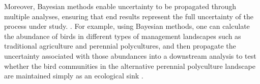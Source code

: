 \documentclass{article}
\begin{document}
\par Moreover, Bayesian methods enable uncertainty to be propagated through multiple analyses, ensuring that end results represent the full uncertainty of the process under study. \citep{draper1995assessment,gilbert2023propagating,Eyster2022,Saunders2019}. For example, using Bayesian methods, one can calculate the abundance of birds in different types of management landscapes such as traditional agriculture and perennial polycultures, and then propagate the uncertainty associated with those abundances into a downstream analysis to test whether the bird communities in the alternative perennial polyculture landscape are maintained simply as an ecological sink \citep{Eyster2022}. 
\end{document}
